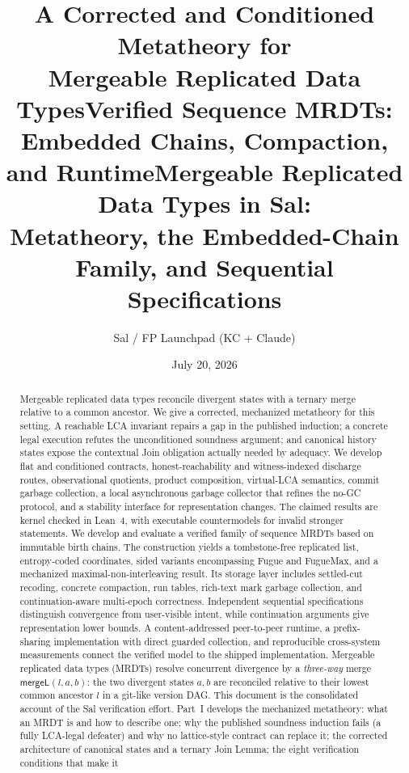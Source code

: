 \documentclass[11pt]{article}
\title{\bfseries A Corrected and Conditioned Metatheory for\\
  \large Mergeable Replicated Data Types}
\title{\bfseries Verified Sequence MRDTs:\\
  \large Embedded Chains, Compaction, and Runtime}
\title{\bfseries Mergeable Replicated Data Types in Sal:\\
  \large Metatheory, the Embedded-Chain Family, and Sequential Specifications}
\author{Sal / FP Launchpad (KC + Claude)}
\date{July 20, 2026}
\newcommand{\mergeL}{\mathsf{mergeL}}
\begin{document}
\maketitle
\sloppy

\begin{abstract}
\noindent
\ifdefined\salPaperA
Mergeable replicated data types reconcile divergent states with a ternary
merge relative to a common ancestor. We give a corrected, mechanized
metatheory for this setting. A reachable LCA invariant repairs a gap in the
published induction; a concrete legal execution refutes the unconditioned
soundness argument; and canonical history states expose the contextual Join
obligation actually needed by adequacy. We develop flat and conditioned
contracts, honest-reachability and witness-indexed discharge routes,
observational quotients, product composition, virtual-LCA semantics, commit
garbage collection, a local asynchronous garbage collector that refines the
no-GC protocol, and a stability interface for representation changes.
The claimed results are kernel checked in Lean~4, with executable
countermodels for invalid stronger statements.
\else\ifdefined\salPaperB
We develop and evaluate a verified family of sequence MRDTs based on immutable
birth chains. The construction yields a tombstone-free replicated list,
entropy-coded coordinates, sided variants encompassing Fugue and FugueMax,
and a mechanized maximal-non-interleaving result. Its storage layer includes
settled-cut recoding, concrete compaction, run tables, rich-text mark garbage
collection, and continuation-aware multi-epoch correctness. Independent
sequential specifications distinguish convergence from user-visible intent,
while continuation arguments give representation lower bounds. A
content-addressed peer-to-peer runtime, a prefix-sharing implementation with
direct guarded collection, and reproducible cross-system measurements connect
the verified model to the shipped implementation.
\else
Mergeable replicated data types (MRDTs) resolve concurrent divergence by
a \emph{three-way} merge $\mergeL(l,a,b)$: the two divergent states
$a,b$ are reconciled relative to their lowest common ancestor $l$ in a
git-like version DAG. This document is the consolidated account of the
Sal verification effort. Part~I develops the mechanized metatheory: what
an MRDT is and how to describe one; why the published soundness
induction fails (a fully LCA-legal defeater) and why no lattice-style
contract can replace it; the corrected architecture of canonical states
and a ternary Join Lemma; the eight verification conditions that make it

\end{abstract}
\end{document}
